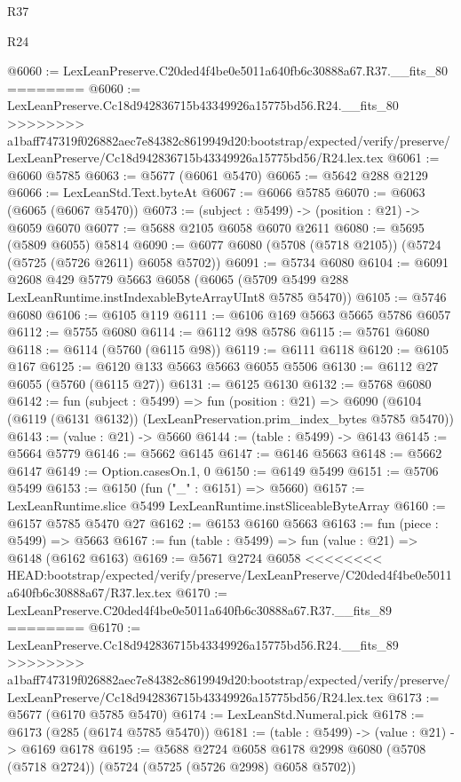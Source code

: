 \begin{lexlean}{R37}
\begin{lexlean}{R24}
\begin{coremodule}
{{{{{{{{{{{{{{{{{{{{{{{{{{{{{{{{{{{{{{{{{{{{{{{{{{{{{{{{{{{{{{{{{{{{{{{{{{{{{{{{{{{{{{{{{{{{{{{{{{{{{{{{{{{{{{{{{{{{{{{{{{{{{{{{{{{{{{{{{{{{{{{{{{{{{{{{{{{{{{{{{{{{{{{{{{{{{{{{{{{{{{{{{@6060 := LexLeanPreserve.C20ded4f4be0e5011a640fb6c30888a67.R37.__fits_80
========
@6060 := LexLeanPreserve.Cc18d942836715b43349926a15775bd56.R24.__fits_80
>>>>>>>> a1baff747319f026882aec7e84382c8619949d20:bootstrap/expected/verify/preserve/LexLeanPreserve/Cc18d942836715b43349926a15775bd56/R24.lex.tex
@6061 := @6060 @5785
@6063 := @5677 (@6061 @5470)
@6065 := @5642 @288 @2129
@6066 := LexLeanStd.Text.byteAt
@6067 := @6066 @5785
@6070 := @6063 (@6065 (@6067 @5470))
@6073 := (subject : @5499) -> (position : @21) -> @6059 @6070
@6077 := @5688 @2105 @6058 @6070 @2611
@6080 := @5695 (@5809 @6055) @5814
@6090 := @6077 @6080 (@5708 (@5718 @2105)) (@5724 (@5725 (@5726 @2611) @6058 @5702))
@6091 := @5734 @6080
@6104 := @6091
    @2608
    @429
    @5779
    @5663
    @6058
    (@6065 (@5709 @5499 @288 LexLeanRuntime.instIndexableByteArrayUInt8 @5785 @5470))
@6105 := @5746 @6080
@6106 := @6105 @119
@6111 := @6106 @169 @5663 @5665 @5786 @6057
@6112 := @5755 @6080
@6114 := @6112 @98 @5786
@6115 := @5761 @6080
@6118 := @6114 (@5760 (@6115 @98))
@6119 := @6111 @6118
@6120 := @6105 @167
@6125 := @6120 @133 @5663 @5663 @6055 @5506
@6130 := @6112 @27 @6055 (@5760 (@6115 @27))
@6131 := @6125 @6130
@6132 := @5768 @6080
@6142 := fun (subject : @5499) =>
  fun (position : @21) =>
  @6090 (@6104 (@6119 (@6131 @6132)) (LexLeanPreservation.prim_index_bytes @5785 @5470))
@6143 := (value : @21) -> @5660
@6144 := (table : @5499) -> @6143
@6145 := @5664 @5779
@6146 := @5662 @6145
@6147 := @6146 @5663
@6148 := @5662 @6147
@6149 := Option.casesOn.{1, 0}
@6150 := @6149 @5499
@6151 := @5706 @5499
@6153 := @6150 (fun ("_" : @6151) => @5660)
@6157 := LexLeanRuntime.slice @5499 LexLeanRuntime.instSliceableByteArray
@6160 := @6157 @5785 @5470 @27
@6162 := @6153 @6160 @5663
@6163 := fun (piece : @5499) => @5663
@6167 := fun (table : @5499) => fun (value : @21) => @6148 (@6162 @6163)
@6169 := @5671 @2724 @6058
<<<<<<<< HEAD:bootstrap/expected/verify/preserve/LexLeanPreserve/C20ded4f4be0e5011a640fb6c30888a67/R37.lex.tex
@6170 := LexLeanPreserve.C20ded4f4be0e5011a640fb6c30888a67.R37.__fits_89
========
@6170 := LexLeanPreserve.Cc18d942836715b43349926a15775bd56.R24.__fits_89
>>>>>>>> a1baff747319f026882aec7e84382c8619949d20:bootstrap/expected/verify/preserve/LexLeanPreserve/Cc18d942836715b43349926a15775bd56/R24.lex.tex
@6173 := @5677 (@6170 @5785 @5470)
@6174 := LexLeanStd.Numeral.pick
@6178 := @6173 (@285 (@6174 @5785 @5470))
@6181 := (table : @5499) -> (value : @21) -> @6169 @6178
@6195 := @5688
    @2724
    @6058
    @6178
    @2998
    @6080
    (@5708 (@5718 @2724))
    (@5724 (@5725 (@5726 @2998) @6058 @5702))
}}}}}}}}}}}}}}}}}}}}}}}}}}}}}}}}}}}}}}}}}}}}}}}}}}}}}}}}}}}}}}}}}}}}}}}}}}}}}}}}}}}}}}}}}}}}}}}}}}}}}}}}}}}}}}}}}}}}}}}}}}}}}}}}}}}}}}}}}}}}}}}}}}}}}}}}}}}}}}}}}}}}}}}}}}}}}}}}}}}}}}}}}
\end{coremodule}
\end{lexlean}
\end{lexlean}
